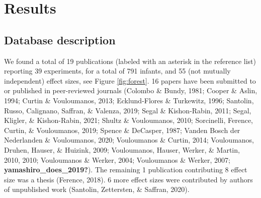 \documentclass[
  english,
  man]{apa6}
\begin{document}
\hypertarget{results}{%
\section{Results}\label{results}}

\hypertarget{database-description}{%
\subsection{Database description}\label{database-description}}

We found a total of 19 publications (labeled with an asterisk in the reference list) reporting 39 experiments, for a total of 791 infants, and 55 (not mutually independent) effect sizes, see Figure \ref{fig:forest}. 16 papers have been submitted to or published in peer-reviewed journals (Colombo \& Bundy, 1981; Cooper \& Aslin, 1994; Curtin \& Vouloumanos, 2013; Ecklund-Flores \& Turkewitz, 1996; Santolin, Russo, Calignano, Saffran, \& Valenza, 2019; Segal \& Kishon-Rabin, 2011; Segal, Kligler, \& Kishon-Rabin, 2021; Shultz \& Vouloumanos, 2010; Sorcinelli, Ference, Curtin, \& Vouloumanos, 2019; Spence \& DeCasper, 1987; Vanden Bosch der Nederlanden \& Vouloumanos, 2020; Vouloumanos \& Curtin, 2014; Vouloumanos, Druhen, Hauser, \& Huizink, 2009; Vouloumanos, Hauser, Werker, \& Martin, 2010, 2010; Vouloumanos \& Werker, 2004; Vouloumanos \& Werker, 2007; \textbf{yamashiro\_does\_2019?}). The remaining 1 publication contributing 8 effect size was a thesis (Ference, 2018). 6 more effect sizes were contributed by authors of unpublished work (Santolin, Zettersten, \& Saffran, 2020).
\end{document}
